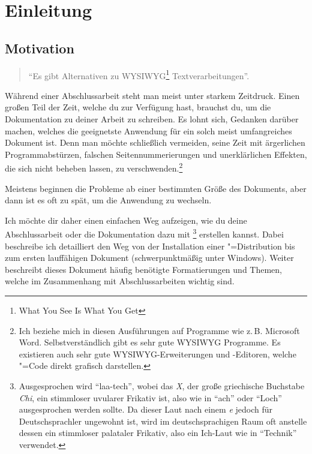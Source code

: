 %
%

\chapter{Einleitung}

\section{Motivation}
\label{sec:motivation}

\begin{quote}
\enquote{Es gibt Alternativen zu WYSIWYG\footnote{What You See Is What You Get} Textverarbeitungen}.
\end{quote}

Während einer Abschlussarbeit steht man meist unter starkem Zeitdruck. Einen großen Teil der Zeit, welche du zur Verfügung hast, brauchst du, um die Dokumentation zu deiner Arbeit zu schreiben. Es lohnt sich, Gedanken darüber machen, welches die geeignetste Anwendung für ein solch meist umfangreiches Dokument ist. Denn man möchte schließlich vermeiden, seine Zeit mit ärgerlichen Programmabstürzen, falschen Seitennummerierungen und unerklärlichen Effekten, die sich nicht beheben lassen, zu verschwenden.\footnote{Ich beziehe mich in diesen Ausführungen auf Programme wie z.\,B. Microsoft Word. Selbstverständlich gibt es sehr gute WYSIWYG Programme. Es existieren auch sehr gute WYSIWYG-Erweiterungen und -Editoren, welche \DMLLaTeX"=Code direkt grafisch darstellen.}

Meistens beginnen die Probleme ab einer bestimmten Größe des Dokuments, aber dann ist es oft zu spät, um die Anwendung zu wechseln.

Ich möchte dir daher einen einfachen Weg aufzeigen, wie du deine Abschlussarbeit oder die Dokumentation dazu mit \DMLLaTeX\footnote{Ausgesprochen wird \DMLLaTeX{} \enquote{laa-tech}, wobei das \emph{X}, der große griechische Buchstabe \emph{Chi}, ein stimmloser uvularer Frikativ ist, also wie in \enquote{ach} oder \enquote{Loch} ausgesprochen werden sollte. Da dieser Laut nach einem \emph{e} jedoch für Deutschsprachler ungewohnt ist, wird im deutschsprachigen Raum oft anstelle dessen ein stimmloser palataler Frikativ, also ein Ich-Laut wie in \enquote{Technik} verwendet.} erstellen kannst. Dabei beschreibe ich detailliert den Weg von der Installation einer \DMLLaTeX"=Distribution bis zum ersten lauf\/fähigen Dokument (schwerpunktmäßig unter Windows). Weiter beschreibt dieses Dokument häufig benötigte Formatierungen und Themen, welche im Zusammenhang mit Abschlussarbeiten wichtig sind.

